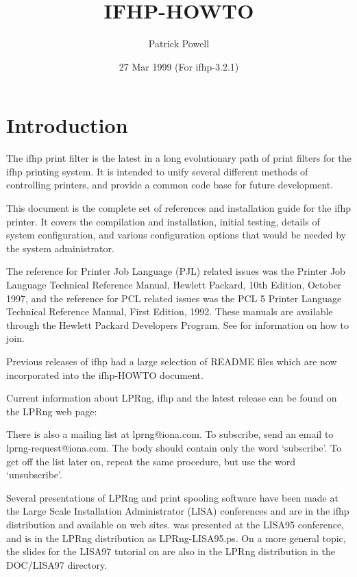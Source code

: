 \documentclass[a4paper]{article}
\title{ IFHP-HOWTO}
\author{Patrick Powell
{\ttfamily \onlynameurl{papowell@astart.com}}}
\date{ 27 Mar 1999 (For ifhp-3.2.1)}
\begin{document}
\maketitle
\tableofcontents

\section{Introduction}

The {\ttfamily ifhp} print filter is the latest in a long evolutionary path
of print filters for the {\ttfamily ifhp} printing system.
It is intended to unify several different methods of controlling
printers,  and provide a common code base for future development.

This document is the complete set of references and
installation guide for the {\ttfamily ifhp} printer.
It covers the compilation and installation,
initial testing,
details of system configuration,
and various configuration options that would be needed by the
system administrator.

The reference for Printer Job Language (PJL) related issues
was the Printer Job Language Technical Reference Manual,
Hewlett Packard, 10th Edition, October 1997,
and the reference for PCL related issues was
the PCL 5 Printer Language Technical Reference Manual,
First Edition, 1992.
These manuals are available through the Hewlett Packard Developers Program.
See
for information on how to join.

Previous releases of {\ttfamily ifhp} had a large selection of
{\ttfamily README}
files
which are now incorporated into the {\ttfamily ifhp}-HOWTO document.

Current information
about LPRng, {\ttfamily ifhp} and the latest release can be found on the LPRng web page:


There is also a mailing list at {\ttfamily lprng@iona.com}. To subscribe,
send an email to {\ttfamily lprng-request@iona.com}. The body should contain
only the word `subscribe'. To get off the list later on, repeat the
same procedure, but use the word `unsubscribe'.

Several presentations of LPRng and print spooling software have been made
at the Large Scale Installation Administrator (LISA) conferences and
are in the {\ttfamily ifhp} distribution and available on web sites.
was presented at the LISA95 conference,
and is in the LPRng distribution as LPRng-LISA95.ps.
On a more general topic,
the slides for the LISA97 tutorial on
are also in the LPRng distribution in the DOC/LISA97 directory.
\end{document}
